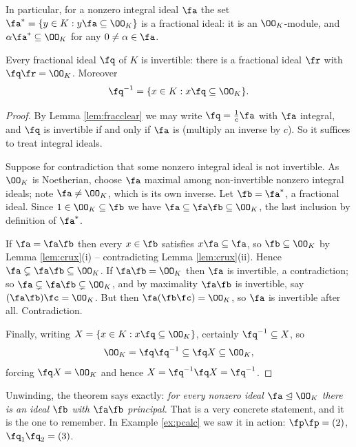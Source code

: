 In particular, for a nonzero integral ideal $\fa$ the set $\fa^* = \{y \in K : y\fa \subseteq \OO_K\}$ is a fractional ideal: it is an $\OO_K$-module, and $\alpha\fa^* \subseteq \OO_K$ for any $0 \neq \alpha \in \fa$.

\begin{theorem}\label{thm:invertible}
	Every fractional ideal $\fq$ of $K$ is invertible: there is a fractional ideal $\fr$ with $\fq\fr = \OO_K$. Moreover
	$$\fq^{-1} = \{x \in K : x\fq \subseteq \OO_K\}.$$
\end{theorem}

\begin{proof}
	By Lemma \ref{lem:fracclear} we may write $\fq = \tfrac{1}{c}\fa$ with $\fa$ integral, and $\fq$ is invertible if and only if $\fa$ is (multiply an inverse by $c$). So it suffices to treat integral ideals.

	Suppose for contradiction that some nonzero integral ideal is not invertible. As $\OO_K$ is Noetherian, choose $\fa$ maximal among non-invertible nonzero integral ideals; note $\fa \neq \OO_K$, which is its own inverse. Let $\fb = \fa^*$, a fractional ideal. Since $1 \in \OO_K \subseteq \fb$ we have $\fa \subseteq \fa\fb \subseteq \OO_K$, the last inclusion by definition of $\fa^*$.

	If $\fa = \fa\fb$ then every $x \in \fb$ satisfies $x\fa \subseteq \fa$, so $\fb \subseteq \OO_K$ by Lemma \ref{lem:crux}(i) -- contradicting Lemma \ref{lem:crux}(ii). Hence $\fa \subsetneq \fa\fb \subseteq \OO_K$. If $\fa\fb = \OO_K$ then $\fa$ is invertible, a contradiction; so $\fa \subsetneq \fa\fb \subsetneq \OO_K$, and by maximality $\fa\fb$ is invertible, say $(\fa\fb)\fc = \OO_K$. But then $\fa(\fb\fc) = \OO_K$, so $\fa$ is invertible after all. Contradiction.

	Finally, writing $X = \{x \in K : x\fq \subseteq \OO_K\}$, certainly $\fq^{-1} \subseteq X$, so
	$$\OO_K = \fq\fq^{-1} \subseteq \fq X \subseteq \OO_K,$$
	forcing $\fq X = \OO_K$ and hence $X = \fq^{-1}\fq X = \fq^{-1}$.
\end{proof}

\begin{remark}
	Unwinding, the theorem says exactly: \emph{for every nonzero ideal $\fa \trianglelefteq \OO_K$ there is an ideal $\fb$ with $\fa\fb$ principal.} That is a very concrete statement, and it is the one to remember. In Example \ref{ex:pcalc} we saw it in action: $\fp\fp = (2)$, $\fq_1\fq_2 = (3)$.
\end{remark}

